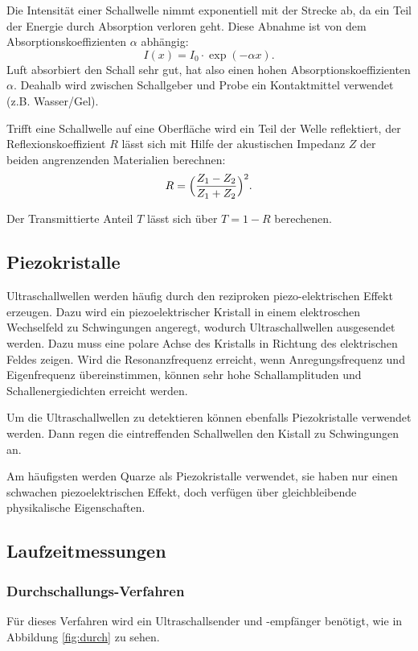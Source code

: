Die Intensität einer Schallwelle nimmt exponentiell mit der Strecke ab, da
ein Teil der Energie durch Absorption verloren geht. Diese Abnahme ist von dem
Absorptionskoeffizienten $\alpha$ abhängig:
\begin{equation}
  I(x)=I_0\cdot \exp{(-\alpha x)}.
  \label{intensität}
\end{equation}
Luft absorbiert den Schall sehr gut, hat also einen hohen Absorptionskoeffizienten $\alpha$.
Deahalb wird zwischen Schallgeber und Probe ein Kontaktmittel verwendet (z.B. Wasser/Gel).

Trifft eine Schallwelle auf eine Oberfläche wird ein Teil der Welle reflektiert, der
Reflexionskoeffizient $R$ lässt sich mit Hilfe der akustischen Impedanz $Z$
der beiden angrenzenden Materialien berechnen:
\begin{equation}
  R=\Bigl(\frac{Z_1 -Z_2}{Z_1 +Z_2}\Bigr)^{2}.
  \label{refexion}
\end{equation}

Der Transmittierte Anteil $T$ lässt sich über $T=1-R$ berechenen.


\subsection{Piezokristalle}
Ultraschallwellen werden häufig durch den reziproken piezo-elektrischen Effekt
erzeugen. Dazu wird ein piezoelektrischer Kristall in einem elektroschen
Wechselfeld zu Schwingungen angeregt, wodurch Ultraschallwellen
ausgesendet werden. Dazu muss eine polare Achse des Kristalls
in Richtung des elektrischen Feldes zeigen.
Wird die Resonanzfrequenz erreicht, wenn Anregungsfrequenz und Eigenfrequenz übereinstimmen, können
sehr hohe Schallamplituden und Schallenergiedichten erreicht werden.

Um die Ultraschallwellen zu detektieren können ebenfalls Piezokristalle
verwendet werden. Dann regen die eintreffenden Schallwellen den Kistall
zu Schwingungen an.

Am häufigsten werden Quarze als Piezokristalle verwendet, sie haben nur einen
schwachen piezoelektrischen Effekt, doch verfügen über gleichbleibende
physikalische Eigenschaften.

\subsection{Laufzeitmessungen}
\subsubsection{Durchschallungs-Verfahren}
Für dieses Verfahren wird ein Ultraschallsender und -empfänger benötigt, wie
in Abbildung \ref{fig:durch} zu sehen.

